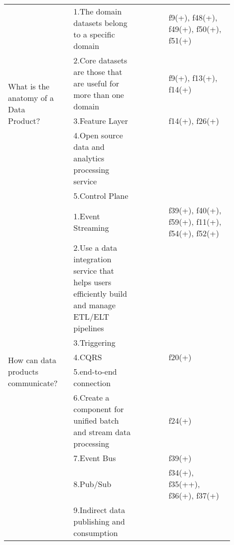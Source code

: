 \begin{tabular}{|p{0.12\linewidth}|p{0.015\linewidth}|p{0.3\linewidth}|p{0.15\linewidth}|p{0.31\linewidth}|}
\multirow{5}{\linewidth}{What is the anatomy of a Data Product?} &\cellcolor{emerald_shape_4}{} &1.The domain datasets belong to a specific domain&\cellcolor{emerald_shape_5}{s3, s5, s7, s20, s45} & f9(+), f48(+), f49(+), f50(+), f51(+)\\
 & \cellcolor{emerald_shape_4}{} & 2.Core datasets are those that are useful for more than one domain&\cellcolor{emerald_shape_5}{s3, s5, s7, s9, s45} & f9(+), f13(+), f14(+)\\
 & \cellcolor{emerald_shape_4}{} & 3.Feature Layer&\cellcolor{emerald_shape_4}{s9, s20, s27, s40} & f14(+), f26(+)\\
 & \cellcolor{emerald_shape_4}{} & 4.Open source data and analytics processing service&\cellcolor{emerald_shape_3}{s32, s39} & \\
 & \multirow{-5}{\linewidth}{ \cellcolor{emerald_shape_4}{14}} &5.Control Plane&\cellcolor{emerald_shape_3}{s49, s52} & \\
\multirow{11}{\linewidth}{How can data products communicate?} &\cellcolor{emerald_shape_6}{} &1.Event Streaming&\cellcolor{emerald_shape_5}{s4, s9, s17, s20, s26, s33, s34, s38, s41, s44, s45, s48, s51, s52, s53} & f39(+), f40(+), f59(+), f11(+), f54(+), f52(+)\\
 & \cellcolor{emerald_shape_6}{} & 2.Use a data integration service that helps users efficiently build and manage ETL/ELT pipelines&\cellcolor{emerald_shape_3}{s4, s5, s15, s30} & \\
 & \cellcolor{emerald_shape_6}{} & 3.Triggering&\cellcolor{emerald_shape_4}{s8, s19, s22, s32, s33, s35, s38, s45} & \\
 & \cellcolor{emerald_shape_6}{} & 4.CQRS&\cellcolor{emerald_shape_2}{s8, s41, s43} & f20(+)\\
 & \cellcolor{emerald_shape_6}{} & 5.end-to-end connection&\cellcolor{emerald_shape_3}{s15, s22, s25, s29} & \\
 & \cellcolor{emerald_shape_6}{} & 6.Create a component for unified batch and stream data processing&\cellcolor{emerald_shape_4}{s14, s20, s25, s28, s30, s32, s36, s39, s41, s44} & f24(+)\\
 & \cellcolor{emerald_shape_6}{} & 7.Event Bus&\cellcolor{emerald_shape_1}{s20} & f39(+)\\
 & \cellcolor{emerald_shape_6}{} & 8.Pub/Sub&\cellcolor{emerald_shape_4}{s18, s30, s32, s37, s38, s39, s41, s53} & f34(+), f35(++), f36(+), f37(+)\\
 & \cellcolor{emerald_shape_6}{} & 9.Indirect data publishing and consumption&\cellcolor{emerald_shape_2}{s41, s43} & \\

\end{tabular}
